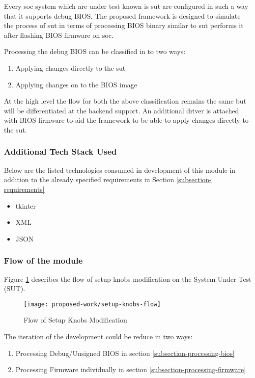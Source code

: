 Every \gls{soc} system which are under test known is \gls{sut} are configured in such a way that it supports debug BIOS. The proposed framework is designed to simulate the process of \gls{sut} in terms of processing BIOS binary similar to \gls{sut} performs it after flashing BIOS firmware on \gls{soc}.

Processing the debug BIOS can be classified in to two ways:
\begin{enumerate}\label{cli-classification-proposed-work}
	\item Applying changes directly to the \gls{sut}
	\item Applying changes on to the BIOS image
\end{enumerate}

At the high level the flow for both the above classification remains the same but will be differentiated at the backend support. An additional driver is attached with BIOS firmware to aid the framework to be able to apply changes directly to the \gls{sut}.

\subsubsection{Additional Tech Stack Used}
Below are the listed technologies consumed in development of this module in addition to the already specified requirements in Section \ref{subsection-requirements}
\begin{itemize}
	\item tkinter
	\item XML
	\item JSON
\end{itemize}

\subsubsection{Flow of the module}
Figure \ref{fig:setup-knobs-flow} describes the flow of setup knobs modification on the System Under Test (SUT).

\begin{figure}[!htbp]
	\centering
	\texttt{[image: proposed-work/setup-knobs-flow]}
	\caption{Flow of Setup Knobs Modification}\label{fig:setup-knobs-flow}
\end{figure}

The iteration of the development could be reduce in two ways:
\begin{enumerate}
	\item Processing Debug/Unsigned BIOS in section \ref{subsection-processing-bios}
	\item Processing Firmware individually in section \ref{subsection-processing-firmware}
\end{enumerate}



